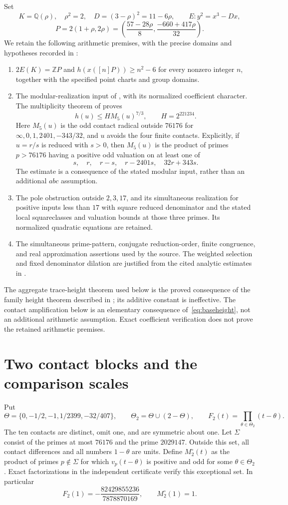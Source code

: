 \documentclass[11pt,a4paper]{article}
\newcommand{\Q}{\mathbb Q}\newcommand{\Z}{\mathbb Z}\newcommand{\HH}{\mathcal H}
\begin{document}
Set
\[
 K=\Q(\rho),\quad \rho^2=2,\quad D=(3-\rho)^2=11-6\rho,
 \qquad E:y^2=x^3-Dx,
\]
\[
 P=2(1+\rho,2\rho)
 =\left(\frac{57-28\rho}{8},\frac{-660+417\rho}{32}\right).
\]
We retain the following arithmetic premises, with the precise domains
and hypotheses recorded in \cite{Dependencies,Source,Weights}:
\begin{enumerate}
\item $2E(K)=\Z P$ and $h(x([n]P))\ge n^2-6$ for every nonzero
integer $n$, together with the specified point charts and group domains.
\item The modular-realization input of
\cite[Definition~6.1]{NewHeight}, with its normalized coefficient
character. The multiplicity theorem of
\cite[Theorem~4.1]{Multiplicity} proves
\begin{equation}\label{eq:baseheight}
 h(u)\le H M_5(u)^{7/3},\qquad H=2^{221234}.
\end{equation}
Here $M_5(u)$ is the odd contact radical outside $76176$ for
$\infty,0,1,2401,-343/32$, and $u$ avoids the four finite contacts.
Explicitly, if $u=r/s$ is reduced with $s>0$, then $M_5(u)$ is
the product of primes $p>76176$ having a positive odd valuation on
at least one of
\[
           s,\quad r,\quad r-s,\quad r-2401s,\quad32r+343s.
\]
The estimate is a consequence of the stated modular input, rather
than an additional $abc$ assumption.
\item The pole obstruction outside $2,3,17$, and its simultaneous
realization for positive inputs less than $17$ with square reduced
denominator and the stated local squareclasses and valuation bounds
at those three primes. Its normalized quadratic equations are retained.
\item The simultaneous prime-pattern, conjugate reduction-order,
finite congruence, and real approximation assertions used by the source.
The weighted selection and fixed denominator dilation are justified
from the cited analytic estimates in \cite{Selection}.
\end{enumerate}
The aggregate trace-height theorem used below is the proved consequence
of the family height theorem described in \cite{Aggregate}; its additive
constant is ineffective. The contact amplification below is an elementary consequence of~\eqref{eq:baseheight},
not an additional arithmetic assumption. Exact coefficient verification
does not prove the retained arithmetic premises.

\section{Two contact blocks and the comparison scales}
Put
\[
 \Theta=\{0,-1/2,-1,1/2399,-32/407\},\qquad
 \Theta_2=\Theta\cup(2-\Theta),\qquad
 F_2(t)=\prod_{\theta\in\Theta_2}(t-\theta).
\]
The ten contacts are distinct, omit one, and are symmetric about one.
Let $\Sigma$ consist of the primes at most $76176$ and the prime
$2029147$. Outside this set, all contact differences and all numbers
$1-\theta$ are units. Define $M_2^\circ(t)$ as the product of primes
$p\notin\Sigma$ for which $v_p(t-\theta)$ is positive and odd for
some $\theta\in\Theta_2$. Exact factorizations in the independent
certificate verify this exceptional set. In particular
\[
 F_2(1)=-\frac{82429855236}{7878870169},\qquad M_2^\circ(1)=1.
\]
\end{document}
